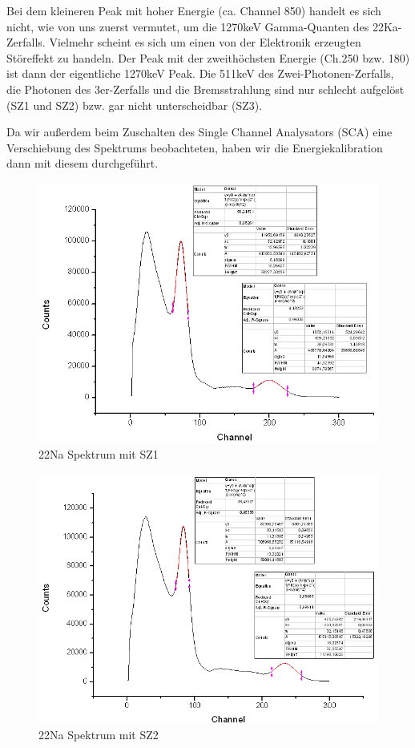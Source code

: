 Bei dem kleineren Peak mit hoher Energie (ca. Channel 850) handelt es sich nicht, wie von uns zuerst vermutet, um die 1270keV Gamma-Quanten des 22Ka-Zerfalls. Vielmehr scheint es sich um einen von der Elektronik erzeugten Störeffekt zu handeln. Der Peak mit der zweithöchsten Energie (Ch.250 bzw. 180) ist dann der eigentliche 1270keV Peak. Die 511keV des Zwei-Photonen-Zerfalls, die Photonen des 3er-Zerfalls und die Bremsstrahlung sind nur schlecht aufgelöst (SZ1 und SZ2) bzw. gar nicht unterscheidbar (SZ3).

Da wir außerdem beim Zuschalten des Single Channel Analysators (SCA) eine Verschiebung des Spektrums beobachteten, haben wir die Energiekalibration dann mit diesem durchgeführt.
\begin{figure}
 \includegraphics[width=\textwidth]{Graphen/SZ1.png}
 \caption{22Na Spektrum mit SZ1}
\end{figure}

\begin{figure}
 \includegraphics[width=\textwidth]{Graphen/SZ2.png}
 \caption{22Na Spektrum mit SZ2}
\end{figure}

